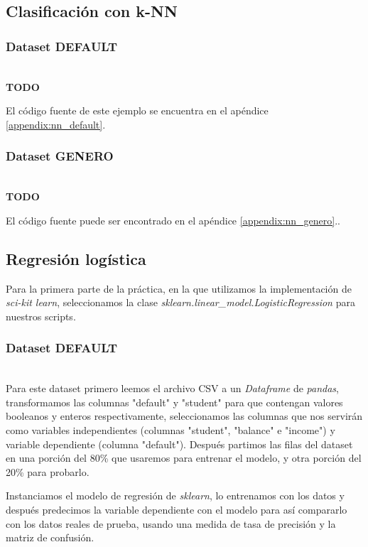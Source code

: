 \documentclass[sigconf,authorversion,nonacm]{acmart}
\begin{document}
\subsection{Clasificación con k-NN}

\subsubsection{Dataset DEFAULT}\hfill\\
\textbf{TODO}

El código fuente de este ejemplo se encuentra en el apéndice \ref{appendix:nn_default}.

\subsubsection{Dataset GENERO}\hfill\\
\textbf{TODO}

El código fuente puede ser encontrado en el apéndice \ref{appendix:nn_genero}..

\subsection{Regresión logística}
Para la primera parte de la práctica, en la que utilizamos la implementación de \textit{sci-kit learn}, seleccionamos la clase \newline\textit{sklearn.linear\_model.LogisticRegression}\cite{scikit-learn} para nuestros scripts.

\subsubsection{Dataset DEFAULT}\hfill\\
Para este dataset primero leemos el archivo CSV a un \textit{Dataframe} de \textit{pandas}, transformamos las columnas "default" y "student" para que contengan valores booleanos y enteros respectivamente, seleccionamos las columnas que nos servirán como variables independientes (columnas "student", "balance" e "income") y variable dependiente (columna "default"). Después partimos las filas del dataset en una porción del 80\% que usaremos para entrenar el modelo, y otra porción del 20\% para probarlo.

Instanciamos el modelo de regresión de \textit{sklearn}, lo entrenamos con los datos y después predecimos la variable dependiente con el modelo para así compararlo con los datos reales de prueba, usando una medida de tasa de precisión y la matriz de confusión.
\end{document}
